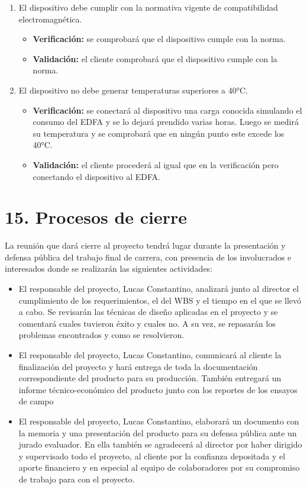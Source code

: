 \documentclass[
11pt, %
codirector, %
]{charter}
\begin{document}
\begin{enumerate}
\begin{enumerate}
\item El dispositivo debe cumplir con la normativa vigente de compatibilidad electromagnética.
\begin{itemize}
	\item \textbf{Verificación:} se comprobará que el dispositivo cumple con la norma.
	\item \textbf{Validación:} el cliente comprobará que el dispositivo cumple con la norma.
\end{itemize}

\item El dispositivo no debe generar temperaturas superiores a 40°C.
\begin{itemize}
	\item \textbf{Verificación:} se conectará al dispositivo una carga conocida simulando el consumo del EDFA y se lo dejará prendido varias horas. Luego se medirá su temperatura y se comprobará que en ningún punto este excede los 40°C.
	\item \textbf{Validación:} el cliente procederá al igual que en la verificación pero conectando el dispositivo al EDFA.
\end{itemize}

\end{enumerate}
\end{enumerate}

\section{15. Procesos de cierre}    
\label{sec:cierre}

La reunión que dará cierre al proyecto tendrá lugar durante la presentación y defensa pública del trabajo final de carrera, con presencia de los involucrados e interesados donde se realizarán las siguientes actividades:

\begin{itemize}
	\item El responsable del proyecto, Lucas Constantino, analizará junto al director el cumplimiento de los requerimientos, el del WBS y el tiempo en el que se llevó a cabo. Se revisarán las técnicas de diseño aplicadas en el proyecto y se comentará cuales tuvieron éxito y cuales no. A su vez, se repasarán los problemas encontrados y como se resolvieron.
	\item El responsable del proyecto, Lucas Constantino, comunicará al cliente la finalización del proyecto y hará entrega de toda la documentación correspondiente del producto para su producción. También entregará un informe técnico-económico del producto junto con los reportes de los ensayos de campo
	\item El responsable del proyecto, Lucas Constantino, elaborará un documento con la memoria y una presentación del producto para su defensa pública ante un jurado evaluador. En ella también se agradecerá al director por haber dirigido y supervisado todo el proyecto, al cliente por la confianza depositada y el aporte financiero y en especial al equipo de colaboradores por su compromiso de trabajo para con el proyecto.
\end{itemize}
\end{document}
